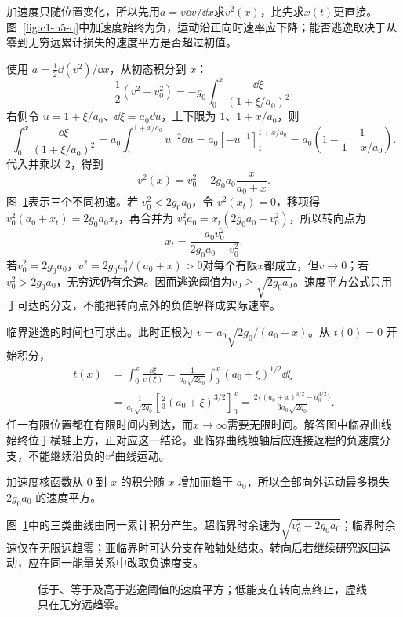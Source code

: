 \begin{solution}
加速度只随位置变化，所以先用$a=v\dd v/\dd x$求$v^2(x)$，比先求$x(t)$更直接。图~\ref{fig:c1-h5-q}中加速度始终为负，运动沿正向时速率应下降；能否逃逸取决于从零到无穷远累计损失的速度平方是否超过初值。


使用 $a=\tfrac12\dd(v^2)/\dd x$，从初态积分到 $x$：
\[
\frac12(v^2-v_0^2)=-g_0\int_0^x\frac{\dd\xi}{(1+\xi/a_0)^2}.
\]
右侧令 $u=1+\xi/a_0$、$\dd\xi=a_0\dd u$，上下限为 $1$、$1+x/a_0$，则
\[
\int_0^x\frac{\dd\xi}{(1+\xi/a_0)^2}
=a_0\int_1^{1+x/a_0}u^{-2}\dd u
=a_0[-u^{-1}]_1^{1+x/a_0}
=a_0\left(1-\frac1{1+x/a_0}\right).
\]
代入并乘以 $2$，得到
\[\boxed{v^2(x)=v_0^2-2g_0a_0\frac{x}{a_0+x}}.
\]
图~\ref{fig:c1-h5-s}表示三个不同初速。若 $v_0^2<2g_0a_0$，令 $v^2(x_t)=0$，移项得 $v_0^2(a_0+x_t)=2g_0a_0x_t$，再合并为 $v_0^2a_0=x_t(2g_0a_0-v_0^2)$，所以转向点为
\[x_t=\frac{a_0v_0^2}{2g_0a_0-v_0^2}.
\]
若$v_0^2=2g_0a_0$，$v^2=2g_0a_0^2/(a_0+x)>0$对每个有限$x$都成立，但$v\to0$；若$v_0^2>2g_0a_0$，无穷远仍有余速。因而逃逸阈值为$\boxed{v_0\ge\sqrt{2g_0a_0}}$。速度平方公式只用于可达的分支，不能把转向点外的负值解释成实际速率。


临界逃逸的时间也可求出。此时正根为 $v=a_0\sqrt{2g_0/(a_0+x)}$。从 $t(0)=0$ 开始积分，
\[
\begin{aligned}
t(x)&=\int_0^x\frac{\dd\xi}{v(\xi)}
=\frac1{a_0\sqrt{2g_0}}\int_0^x(a_0+\xi)^{1/2}\dd\xi\\
&=\frac1{a_0\sqrt{2g_0}}\left[\frac23(a_0+\xi)^{3/2}\right]_0^x
=\frac{2\{(a_0+x)^{3/2}-a_0^{3/2}\}}{3a_0\sqrt{2g_0}}.
\end{aligned}
\]
任一有限位置都在有限时间内到达，而$x\to\infty$需要无限时间。解答图中临界曲线始终位于横轴上方，正对应这一结论。亚临界曲线触轴后应连接返程的负速度分支，不能继续沿负的$v^2$曲线运动。

加速度核函数从 $0$ 到 $x$ 的积分随 $x$ 增加而趋于 $a_0$，所以全部向外运动最多损失 $2g_0a_0$ 的速度平方。

图~\ref{fig:c1-h5-s}中的三类曲线由同一累计积分产生。超临界时余速为$\sqrt{v_0^2-2g_0a_0}$；临界时余速仅在无限远趋零；亚临界时可达分支在触轴处结束。转向后若继续研究返回运动，应在同一能量关系中改取负速度支。

\begin{figure}[H]\centering
{}
\caption{低于、等于及高于逃逸阈值的速度平方；低能支在转向点终止，虚线只在无穷远趋零。}\label{fig:c1-h5-s}
\end{figure}
\end{solution}

